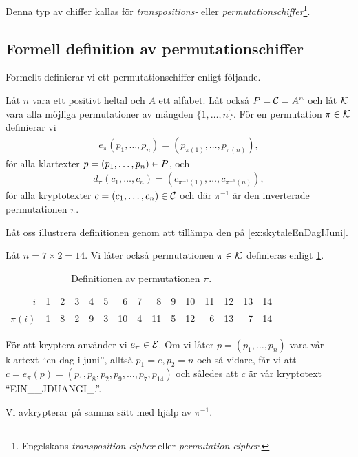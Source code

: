 Denna typ av chiffer kallas för 
\emph{transpositions-} eller 
\emph{permutationschiffer}\footnote{%
	Engelskans \emph{transposition cipher} eller \emph{permutation cipher}.
}.

\subsection{Formell definition av permutationschiffer}
Formellt definierar vi ett permutationschiffer enligt följande.
\begin{definition}[Permutationschiffer]\label{def:permutationCipher}
  Låt \(n\) vara ett positivt heltal och \(A\) ett alfabet.
  Låt också \(\P = \C = A^n\) och låt \(\operatorname{\mathcal{K}}\) vara alla möjliga permutationer av 
  mängden \(\{1,\ldots,n\}\).
  För en permutation \(\pi\in \operatorname{\mathcal{K}}\) definierar vi
  \begin{align}
    \nonumber
    e_\pi(p_1,\ldots,p_n) = (p_{\pi(1)},\ldots,p_{\pi(n)}),
  \end{align}
  för alla klartexter \(p = (p_1,\ldots,p_n)\in \P\), och
  \begin{align}
    \nonumber
    d_\pi(c_1,\ldots,c_n) = (c_{\pi^{-1}(1)},\ldots,c_{\pi^{-1}(n)}),
  \end{align}
  för alla kryptotexter \(c = (c_1,\ldots,c_n)\in \operatorname{\mathcal{C}}\) och där \(\pi^{-1}\) är 
  den inverterade permutationen \(\pi\).
\end{definition}

Låt oss illustrera definitionen genom att tillämpa den på 
\cref{ex:skytaleEnDagIJuni}.
\begin{example}\label{ex:permutationEnDagIJuni}
  Låt \(n = 7\times 2 = 14\).
  Vi låter också permutationen \(\pi\in \operatorname{\mathcal{K}}\) definieras enligt 
  \cref{tbl:pi}.
  \begin{table}
    \caption{%
      Definitionen av permutationen \(\pi\).
    }\label{tbl:pi}
    \centering
    \begin{tabular}{rrrrrrrrrrrrrrr}
      \toprule
      \(i\)       & 1 & 2 & 3 & 4 & 5 & 6 & 7 & 8 & 9 & 10 & 11 & 12 & 13 & 14 
      \\
      \(\pi(i)\)  & 1 & 8 & 2 & 9 & 3 & 10 & 4 & 11 & 5 & 12 & 6 & 13 & 7 & 14 
      \\
      \bottomrule
    \end{tabular}
  \end{table}
  För att kryptera använder vi \(e_\pi\in \operatorname{\mathcal{E}}\).
  Om vi låter \(p = (p_1, \ldots, p_n)\) vara vår klartext \enquote{en dag 
    i juni}, alltså \(p_1 = e, p_2 = n\) och så vidare, får vi att \(c 
    = e_\pi(p) = (p_1, p_8, p_2, p_9, \ldots, p_7, p_{14})\) och således att 
  \(c\) är vår kryptotext \enquote{EIN\_\_JDUANGI\_.}.

  Vi avkrypterar på samma sätt med hjälp av \(\pi^{-1}\).
\end{example}

